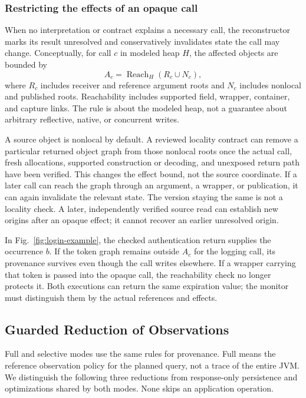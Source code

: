 \subsubsection{Restricting the effects of an opaque call}

When no interpretation or contract explains a necessary call, the
reconstructor marks its result unresolved and conservatively invalidates
state the call may change. Conceptually, for call $c$ in modeled heap $H$,
the affected objects are bounded by
\begin{equation}
   A_c=\operatorname{Reach}_H(R_c\cup N_c),
   \label{eq:effect-reach}
\end{equation}
where $R_c$ includes receiver and reference argument roots and $N_c$
includes nonlocal and published roots. Reachability includes supported
field, wrapper, container, and capture links. The rule is about the modeled
heap, not a guarantee about arbitrary reflective, native, or concurrent
writes.

A source object is nonlocal by default. A reviewed locality contract can
remove a particular returned object graph from those nonlocal roots once
the actual call, fresh allocations, supported construction or decoding,
and unexposed return path have been verified. This changes the effect
bound, not the source coordinate. If a later call can reach the graph
through an argument, a wrapper, or publication, it can again invalidate
the relevant state. The version staying the same is not a locality check.
A later, independently verified source read can establish new origins
after an opaque effect; it cannot recover an earlier unresolved origin.

In Fig.~\ref{fig:login-example}, the checked authentication return
supplies the occurrence $b$. If the token graph remains outside $A_c$
for the logging call, its provenance survives even though the call
writes elsewhere. If a wrapper carrying that token is passed into the
opaque call, the reachability check no longer protects it. Both executions
can return the same expiration value; the monitor must distinguish them
by the actual references and effects.

\subsection{Guarded Reduction of Observations}
\label{sec:method-reduction}

Full and selective modes use the same rules for provenance. Full means
the reference observation policy for the planned query, not a trace of
the entire JVM. We distinguish the following three reductions from
response-only persistence and optimizations shared by both modes.
None skips an application operation.

